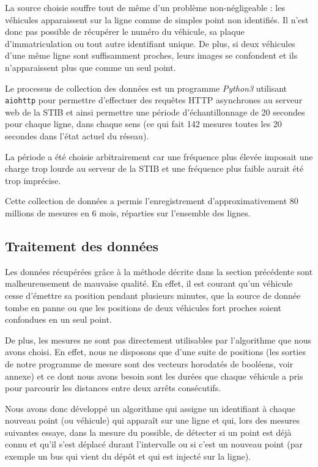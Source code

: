 \documentclass[letterpaper]{article}
\begin{document}
La source choisie souffre tout de même d'un problème non-négligeable : les véhicules apparaissent sur la ligne comme de simples point non identifiés. Il n'est donc pas possible de récupérer le numéro du véhicule, sa plaque d'immatriculation ou tout autre identifiant unique. De plus, si deux véhicules d'une même ligne sont suffisamment proches, leurs images se confondent et ils n'apparaissent plus que comme un seul point.

Le processus de collection des données est un programme \textit{Python3} utilisant \texttt{aiohttp} pour permettre d'effectuer des requêtes HTTP asynchrones au serveur web de la STIB et ainsi permettre une période d’échantillonnage de 20 secondes pour chaque ligne, dans chaque sens (ce qui fait 142 mesures toutes les 20 secondes dans l'état actuel du réseau).

La période a été choisie arbitrairement car une fréquence plus élevée imposait une charge trop lourde au serveur de la STIB et une fréquence plus faible aurait été trop imprécise.

Cette collection de données a permis l'enregistrement d'approximativement 80 millions de mesures en 6 mois, réparties sur l'ensemble des lignes.


\subsection{Traitement des données}

Les données récupérées grâce à la méthode décrite dans la section précédente sont malheureusement de mauvaise qualité. En effet, il est courant qu'un véhicule cesse d’émettre sa position pendant plusieurs minutes, que la source de donnée tombe en panne ou que les positions de deux véhicules fort proches soient confondues en un seul point.

De plus, les mesures ne sont pas directement utilisables par l'algorithme que nous avons choisi. En effet, nous ne disposons que d'une suite de positions (les sorties de notre programme de mesure sont des vecteurs horodatés de booléens, voir annexe) et ce dont nous avons besoin sont les durées que chaque véhicule a pris pour parcourir les distances entre deux arrêts consécutifs.

Nous avons donc développé un algorithme qui assigne un identifiant à chaque nouveau point (ou véhicule) qui apparaît sur une ligne et qui, lors des mesures suivantes essaye, dans la mesure du possible, de détecter  si un point est déjà connu et qu'il s'est déplacé durant l’intervalle ou si c'est un nouveau point (par exemple un bus qui vient du dépôt et qui est injecté sur la ligne).
\end{document}

